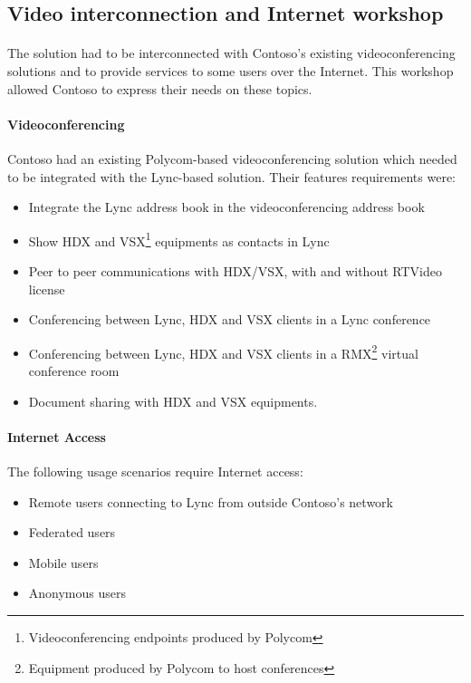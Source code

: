 \subsection{Video interconnection and Internet workshop}
	\paragraph{}
	The solution had to be interconnected with Contoso's existing videoconferencing solutions and to provide services to some users over the Internet. This workshop allowed Contoso to express their needs on these topics.

	\paragraph{Videoconferencing}
	Contoso had an existing Polycom-based videoconferencing solution which needed to be integrated with the Lync-based solution. Their features requirements were:
	\begin{itemize}
	\item Integrate the Lync address book in the videoconferencing address book
	\item Show HDX and VSX\footnote{Videoconferencing endpoints produced by Polycom} equipments as contacts in Lync
	\item Peer to peer communications with HDX/VSX, with and without RTVideo license
	\item Conferencing between Lync, HDX and VSX clients in a Lync conference
	\item Conferencing between Lync, HDX and VSX clients in a RMX\footnote{Equipment produced by Polycom to host conferences} virtual conference room
	\item Document sharing with HDX and VSX equipments.
	\end{itemize}


	\paragraph{Internet Access}
	The following usage scenarios require Internet access:
	\begin{itemize}
		\item Remote users connecting to Lync from outside Contoso's network
		\item Federated users
		\item Mobile users
		\item Anonymous users
	\end{itemize}

